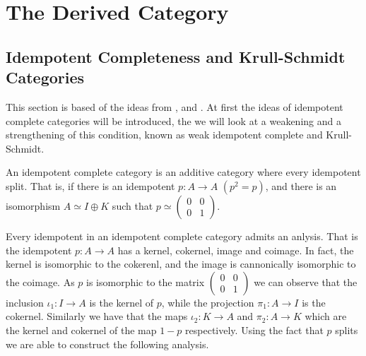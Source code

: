 \chapter{The Derived Category}

\section{Idempotent Completeness and Krull-Schmidt Categories}

    This section is based of the ideas from \cite{buhler}, \cite{Kra12} and \cite{Rei95}. At first the ideas of idempotent complete categories will be introduced, the we will look at a weakening and a strengthening of this condition, known as weak idempotent complete and Krull-Schmidt.

    \begin{definition}
        An idempotent complete category is an additive category where every idempotent split. That is, if there is an idempotent $p:A\rightarrow A$ $(p^2=p)$, and there is an isomorphism $A\simeq I\oplus K$ such that $p\simeq \begin{pmatrix} 0 & 0 \\ 0 & 1 \end{pmatrix}$. 
    \end{definition}

    Every idempotent in an idempotent complete category admits an anlysis. That is the idempotent $p:A\rightarrow A$ has a kernel, cokernel, image and coimage. In fact, the kernel is isomorphic to the cokerenl, and the image is cannonically isomorphic to the coimage. As $p$ is isomorphic to the matrix $\begin{pmatrix} 0 & 0 \\ 0 & 1 \end{pmatrix}$ we can observe that the inclusion $\iota_1:I\rightarrow A$ is the kernel of $p$, while the projection $\pi_1:A\rightarrow I$ is the cokernel. Similarly we have that the maps $\iota_2:K\rightarrow A$ and $\pi_2:A\rightarrow K$ which are the kernel and cokernel of the map $1-p$ respectively. Using the fact that $p$ splits we are able to construct the following analysis.

    \begin{center}
    \end{center}

